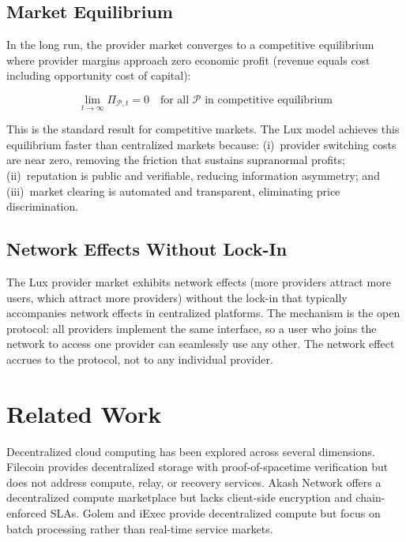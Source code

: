 \documentclass[11pt,a4paper]{article}
\begin{document}
\subsection{Market Equilibrium}

In the long run, the provider market converges to a competitive equilibrium
where provider margins approach zero economic profit (revenue equals cost
including opportunity cost of capital):

\begin{equation}
    \lim_{t \to \infty} \Pi_{\mathcal{P}, t} = 0 \quad \text{for all } \mathcal{P} \text{ in competitive equilibrium}
\end{equation}

This is the standard result for competitive markets. The Lux model achieves
this equilibrium faster than centralized markets because: (i)~provider
switching costs are near zero, removing the friction that sustains
supranormal profits; (ii)~reputation is public and verifiable, reducing
information asymmetry; and (iii)~market clearing is automated and
transparent, eliminating price discrimination.

\subsection{Network Effects Without Lock-In}

The Lux provider market exhibits network effects (more providers attract
more users, which attract more providers) without the lock-in that
typically accompanies network effects in centralized platforms. The
mechanism is the open protocol: all providers implement the same
interface, so a user who joins the network to access one provider
can seamlessly use any other. The network effect accrues to the
protocol, not to any individual provider.

\section{Related Work}\label{sec:related}

Decentralized cloud computing has been explored across several
dimensions. Filecoin \cite{benet2017filecoin} provides decentralized
storage with proof-of-spacetime verification but does not address
compute, relay, or recovery services. Akash Network \cite{akash2020}
offers a decentralized compute marketplace but lacks client-side
encryption and chain-enforced SLAs. Golem \cite{golem2016} and
iExec \cite{iexec2017} provide decentralized compute but focus on
batch processing rather than real-time service markets.
\end{document}

